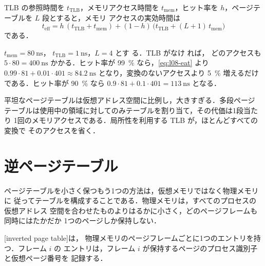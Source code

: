 \documentclass[../main.tex]{subfiles}
\begin{document}
TLB の参照時間を $t_{\mathrm{TLB}}$，メモリアクセス時間を
$t_{\mathrm{mem}}$，ヒット率を $h$，ページテーブルを $L$ 段とすると，メモリ
アクセスの実効時間は
\begin{equation}
  t_{\mathrm{eff}} = h\,(t_{\mathrm{TLB}} + t_{\mathrm{mem}})
    + (1-h)\,\bigl(t_{\mathrm{TLB}} + (L+1)\,t_{\mathrm{mem}}\bigr)
  \label{eq:l08-eat}
\end{equation}
である．

\begin{example}
  $t_{\mathrm{mem}} = \SI{80}{\nano\second}$，
  $t_{\mathrm{TLB}} = \SI{1}{\nano\second}$，$L = 4$ とす
  る．TLB がなけ
  れば，
  どのアクセスも $5 \cdot 80 = \SI{400}{\nano\second}$ かかる．ヒット率が
  \SI{99}{\percent} なら，\cref{eq:l08-eat} より $0.99 \cdot 81 + 0.01 \cdot
  401 \approx \SI{84.2}{\nano\second}$ となり，変換のないアクセスより
  \SI{5}{\percent} 増えるだけである．ヒット率が \SI{90}{\percent} なら
  $0.9 \cdot 81 + 0.1 \cdot 401 = \SI{113}{\nano\second}$ となる．
\end{example}

\begin{keypoint}
  平坦なページテーブルは仮想アドレス空間に比例し，大きすぎる．多段ページ
  テーブルは使用中の領域に対してのみテーブルを割り当て，その代価は1段当たり
  1回のメモリアクセスである．局所性を利用する TLB が，ほとんどすべての変換で
  そのアクセスを省く．
\end{keypoint}

\section{逆ページテーブル}
\label{sec:l08-inverted}

ページテーブルを小さく保つもう1つの方法は，仮想メモリではなく物理メモリに
従ってテーブルを構成することである．物理メモリは，すべてのプロセスの仮想アドレス
空間を合わせたものよりはるかに小さく，どのページフレームも同時にはたかだか
1つのページしか保持しない．

\begin{definition}[逆ページテーブル]
  [inverted page table]は，
  物理メモリのページフレームごとに1つのエントリを持つ．フレーム $i$ の
  エントリは，フレーム $i$ が保持するページのプロセス識別子と仮想ページ番号を
  記録する．
\end{definition}
\end{document}
